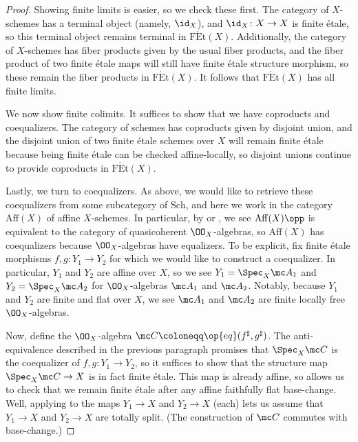 \documentclass{amsart}
\begin{document}
\begin{proof}
    Showing finite limits is easier, so we check these first. The category of $X$-schemes has a terminal object (namely, $\id_X$), and $\id_X\colon X\to X$ is finite \'etale, so this terminal object remains terminal in $\mathrm{F\acute Et}(X)$. Additionally, the category of $X$-schemes has fiber products given by the usual fiber products, and the fiber product of two finite \'etale maps will still have finite \'etale structure morphism, so these remain the fiber products in $\mathrm{F\acute Et}(X)$. It follows that $\mathrm{F\acute Et}(X)$ has all finite limits.

    We now show finite colimits. It suffices to show that we have coproducts and coequalizers. The category of schemes has coproducts given by disjoint union, and the disjoint union of two finite \'etale schemes over $X$ will remain finite \'etale because being finite \'etale can be checked affine-locally, so disjoint unions continue to provide coproducts in $\mathrm{F\acute Et}(X)$.

    Lastly, we turn to coequalizers. As above, we would like to retrieve these coequalizers from some subcategory of $\mathrm{Sch}$, and here we work in the category $\mathrm{Aff}(X)$ of affine $X$-schemes. In particular, by \cite[Exercise~II.5.17]{hartshorne} or \cite[\href{https://stacks.math.columbia.edu/tag/01SA}{Lemma 01SA}]{stacks}, we see $\mathrm{Aff}(X)\opp$ is equivalent to the category of quasicoherent $\OO_X$-algebras, so $\mathrm{Aff}(X)$ has coequalizers because $\OO_X$-algebras have equalizers. To be explicit, fix finite \'etale morphisms $f,g\colon Y_1\to Y_2$ for which we would like to construct a coequalizer. In particular, $Y_1$ and $Y_2$ are affine over $X$, so we see $Y_1=\Spec_X\mc A_1$ and $Y_2=\Spec_X\mc A_2$ for $\OO_X$-algebras $\mc A_1$ and $\mc A_2$. Notably, because $Y_1$ and $Y_2$ are finite and flat over $X$, we see $\mc A_1$ and $\mc A_2$ are finite locally free $\OO_X$-algebras.

    Now, define the $\OO_X$-algebra $\mc C\coloneqq\op{eq}(f^\sharp,g^\sharp)$. The anti-equivalence described in the previous paragraph promises that $\Spec_X\mc C$ is the coequalizer of $f,g\colon Y_1\to Y_2$, so it suffices to show that the structure map $\Spec_X\mc C\to X$ is in fact finite \'etale. This map is already affine, so  allows us to check that we remain finite \'etale after any affine faithfully flat base-change. Well, applying  to the maps $Y_1\to X$ and $Y_2\to X$ (each) lets us assume that $Y_1\to X$ and $Y_2\to X$ are totally split. (The construction of $\mc C$ commutes with base-change.)


\end{proof}
\end{document}
